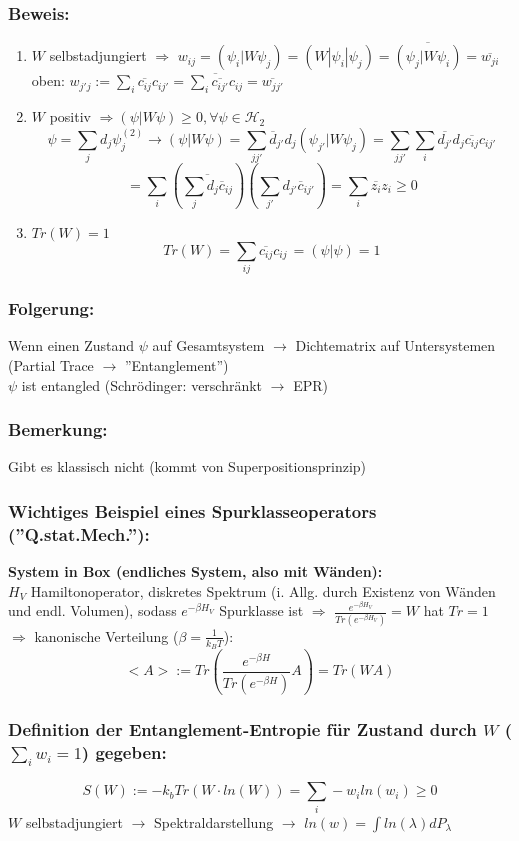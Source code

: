 \documentclass[twoside,a4paper]{scrartcl}
\renewcommand{\1}{\mathds{1}}
\newcommand{\Ra}{\Rightarrow}
\newcommand{\ra}{\rightarrow}
\renewcommand{\l}{\lambda}
\renewcommand{\H}{\mathcal{H}}
\begin{document}
\subsubsection*{Beweis:} 
\begin{enumerate}
\item $W$ selbstadjungiert $\Ra$ $w_{ij}=(\psi_i|W\psi_j)=(W|\psi_i|\psi_j)=\overline{(\psi_j|W\psi_i)}= \overline{w_{ji}}$\\
oben: $w_{j'j}:=\sum_i \overline{c_{ij}}c_{ij'}= \overline{\sum_i \overline{c_{ij'}}c_{ij}}=\overline{w_{jj'}}$
\item $W$ positiv $\Ra (\psi|W\psi) \geq 0, \forall \psi \in \H_2$\\
$$\psi=\sum_j d_j \psi_j^{(2)} \ra (\psi|W\psi)=\sum_{jj'} \overline{d}_{j'}d_j (\psi_{j'}|W\psi_j)=\sum_{jj'} \sum_i \overline{d_{j'}}d_j \overline{c_{ij}}c_{ij'}$$
$$=\sum_i (\overline{\sum_j d_j \overline{c}_{ij}}) (\sum_{j'} d_{j'}\overline{c}_{ij'})=\sum_i \overline{z_i}z_i \geq 0$$
\item $Tr(W)=1$\\
$$Tr(W)=\sum_{ij} \overline{c_{ij}}c_{ij~}=(\psi|\psi)=1$$
\end{enumerate}
\subsubsection*{Folgerung:} 
Wenn einen Zustand $\psi$ auf Gesamtsystem $\ra$ Dichtematrix auf Untersystemen (Partial Trace $\ra$ ''Entanglement'')\\
$\psi$ ist entangled (Schrödinger: verschränkt $\ra$ EPR)
\subsubsection*{Bemerkung:} 
Gibt es klassisch nicht (kommt von Superpositionsprinzip)
\subsubsection*{Wichtiges Beispiel eines Spurklasseoperators (''Q.stat.Mech.''):} 
\textbf{System in Box (endliches System, also mit Wänden):}\\
$H_V$ Hamiltonoperator, diskretes Spektrum (i. Allg. durch Existenz von Wänden und endl. Volumen), sodass $e^{-\beta H_V}$ Spurklasse ist $\Ra$ $\frac{e^{-\beta H_V}}{Tr(e^{-\beta H_V})}=W$ hat $Tr=1$\\
$\Ra$ kanonische Verteilung ($\beta=\frac{1}{k_B T}$):
$$<A>:= Tr(\frac{e^{-\beta H}}{Tr(e^{-\beta H})}A)=Tr(WA)$$
\subsubsection*{Definition der Entanglement-Entropie für Zustand durch $W$ ($\sum_i w_i=1$) gegeben:} 
$$S(W):=-k_b Tr(W \cdot ln(W))=\sum_i -w_i ln(w_i)\geq 0$$
$W$ selbstadjungiert $\ra$ Spektraldarstellung $\ra$ $ln(w)=\int ln(\l) dP_\l$
\end{document}
